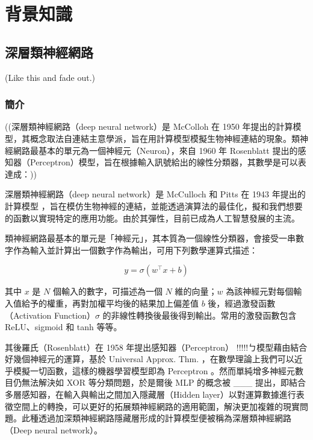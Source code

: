 
\chapter{背景知識}

\section{深層類神經網路}

(Like this \cite{lecun_gradient-based_1998, baevski_wav2vec_2020} and fade out.)

\subsection{簡介}

((深層類神經網路（deep neural network）是 McColloh 在 1950 年提出的計算模型，其概念取法自連結主意學派，旨在用計算模型模擬生物神經連結的現象。類神經網路最基本的單元為一個神經元（Neuron），來自 1960 年 Rosenblatt 提出的感知器（Perceptron）模型，旨在根據輸入訊號給出的線性分類器，其數學是可以表達成：))

深層類神經網路（deep neural network）是 McCulloch 和 Pitts 在 1943 年提出的計算模型 \cite{mcculloch_logical_1943}，旨在模仿生物神經的連結，並能透過演算法的最佳化，擬和我們想要的函數以實現特定的應用功能。由於其彈性，目前已成為人工智慧發展的主流。

類神經網路最基本的單元是「神經元」，其本質為一個線性分類器，會接受一串數字作為輸入並計算出一個數字作為輸出，可用下列數學運算式描述：

\[ y=\sigma(w^\top x + b) \]

其中 \(x\) 是 \(N\) 個輸入的數字，可描述為一個 \(N\) 維的向量；\(w\) 為該神經元對每個輸入值給予的權重，再對加權平均後的結果加上偏差值 \(b\) 後，經過激發函數（Activation Function）\(\sigma\) 的非線性轉換後最後得到輸出。常用的激發函數包含 ReLU、sigmoid 和 tanh 等等。

其後羅氏（Rosenblatt）在 1958 年提出感知器（Perceptron） !!!!!ㄅ模型藉由結合好幾個神經元的運算，基於 Universal Approx. Thm. ，在數學理論上我們可以近乎模擬一切函數，這樣的機器學習模型即為 Perceptron \cite{rosenblatt_perceptron_1958}。然而單純增多神經元數目仍無法解決如 XOR 等分類問題，於是爾後 MLP 的概念被 \_\_\_ 提出，即結合多層感知器，在輸入與輸出之間加入隱藏層（Hidden layer）以對運算數據進行表徵空間上的轉換，可以更好的拓展類神經網路的適用範圍，解決更加複雜的現實問題。此種透過加深類神經網路隱藏層形成的計算模型便被稱為深層類神經網路（Deep neural network）。

